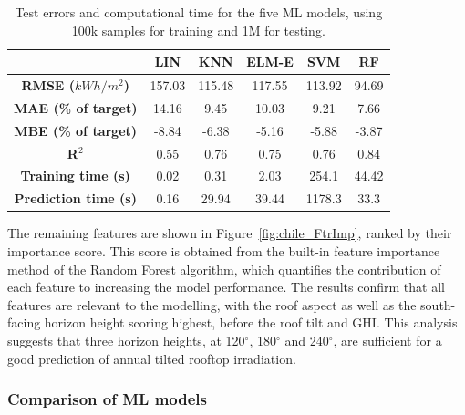 \begin{table}[tb]
\centering
\footnotesize
\caption{Test errors and computational time for the five ML models, using 100k samples for training and 1M for testing.}
\label{tab:chile_results}
\begin{tabular}{cccccc}
\hline
\textbf{}                    & \textbf{LIN} & \textbf{KNN} & \textbf{ELM-E} & \textbf{SVM} & \textbf{RF} \\ \hline
\textbf{RMSE ($kWh/m^2$)}       & 157.03       & 115.48       & 117.55         & 113.92       & 94.69       \\
\textbf{MAE (\% of target)}  & 14.16        & 9.45         & 10.03          & 9.21         & 7.66        \\
\textbf{MBE (\% of target)}  & -8.84        & -6.38        & -5.16          & -5.88        & -3.87       \\
\textbf{R$^2$}                  & 0.55         & 0.76         & 0.75           & 0.76         & 0.84        \\
\textbf{Training time (s)}   & 0.02         & 0.31         & 2.03           & 254.1        & 44.42       \\
\textbf{Prediction time (s)} & 0.16         & 29.94        & 39.44          & 1178.3       & 33.3        \\ \hline
\end{tabular}
\end{table}

The remaining features are shown in Figure~\ref{fig:chile_FtrImp}, ranked by their importance score. This score is obtained from the built-in feature importance method of the Random Forest algorithm, which quantifies the contribution of each feature to increasing the model performance. The results confirm that all features are relevant to the modelling, with the roof aspect as well as the south-facing horizon height scoring highest, before the roof tilt and GHI. This analysis suggests that three horizon heights, at 120$^\circ$, 180$^\circ$ and 240$^\circ$, are sufficient for a good prediction of annual tilted rooftop irradiation.

\subsubsection{Comparison of ML models}

